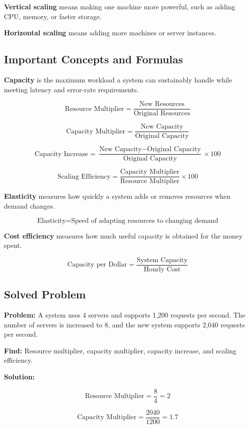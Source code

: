 \documentclass[11pt]{article}
\begin{document}
\textbf{Vertical scaling} means making one machine more powerful, such as adding CPU, memory, or faster storage.

\textbf{Horizontal scaling} means adding more machines or server instances.

\subsection*{Important Concepts and Formulas}

\textbf{Capacity} is the maximum workload a system can sustainably handle while meeting latency and error-rate requirements.

\[
\text{Resource Multiplier}
=
\frac{\text{New Resources}}{\text{Original Resources}}
\]

\[
\text{Capacity Multiplier}
=
\frac{\text{New Capacity}}{\text{Original Capacity}}
\]

\[
\text{Capacity Increase}
=
\frac{\text{New Capacity} - \text{Original Capacity}}
{\text{Original Capacity}}
\times 100
\]

\[
\text{Scaling Efficiency}
=
\frac{\text{Capacity Multiplier}}
{\text{Resource Multiplier}}
\times 100
\]

\textbf{Elasticity} measures how quickly a system adds or removes resources when demand changes.

\[
\boxed{\text{Elasticity} = \text{Speed of adapting resources to changing demand}}
\]

\textbf{Cost efficiency} measures how much useful capacity is obtained for the money spent.

\[
\text{Capacity per Dollar}
=
\frac{\text{System Capacity}}{\text{Hourly Cost}}
\]

\subsection*{Solved Problem}

\textbf{Problem:} A system uses 4 servers and supports 1,200 requests per second. The number of servers is increased to 8, and the new system supports 2,040 requests per second.

\textbf{Find:} Resource multiplier, capacity multiplier, capacity increase, and scaling efficiency.

\textbf{Solution:}

\[
\text{Resource Multiplier}
=
\frac{8}{4}
=
2
\]

\[
\text{Capacity Multiplier}
=
\frac{2040}{1200}
=
1.7
\]
\end{document}
